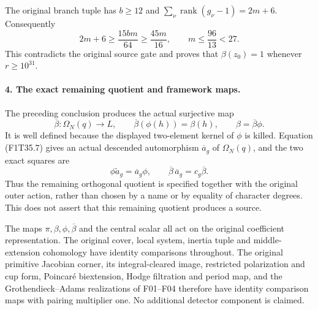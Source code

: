 The original branch tuple has \(b\ge12\) and
\(\sum_\nu\operatorname{rank}(g_\nu-1)=2m+6\).
Consequently
\[
               2m+6\ge\frac{15bm}{64}
                      \ge\frac{45m}{16},
               \qquad m\le\frac{96}{13}<27.
 \tag{F1T35.16}
\]
This contradicts the original source gate and
proves that \(\beta(z_0)=1\) whenever
\(r\ge10^{31}\).

\paragraph{4. The exact remaining quotient and framework maps.}
The preceding conclusion produces the actual
surjective map
\[
 \overline\beta:\Omega_N(q)\longrightarrow L,
 \qquad \overline\beta(\phi(h))=\beta(h),
 \qquad \beta=\overline\beta\phi.
 \tag{F1T35.17}
\]
It is well defined because the displayed
two-element kernel of \(\phi\) is killed.
Equation (F1T35.7) gives an actual descended
automorphism \(\overline a_g\) of
\(\Omega_N(q)\), and the two exact squares are
\[
 \phi\widetilde a_g=\overline a_g\phi,
 \qquad \overline\beta\,\overline a_g
                  =c_g\overline\beta.
 \tag{F1T35.18}
\]
Thus the remaining orthogonal quotient is
specified together with the original outer
action, rather than chosen by a name or by
equality of character degrees. This does not
assert that this remaining quotient produces
a source.

The maps \(\pi,\beta,\phi,\overline\beta\)
and the central scalar all act on the original
coefficient representation. The original
cover, local system, inertia tuple and
middle-extension cohomology have identity
comparisons throughout. The original primitive
Jacobian corner, its integral-cleared image,
restricted polarization and cup form, Poincar\'e
biextension, Hodge filtration and period map,
and the Grothendieck--Adams realizations of
F01--F04 therefore have identity comparison
maps with pairing multiplier one. No additional
detector component is claimed.
